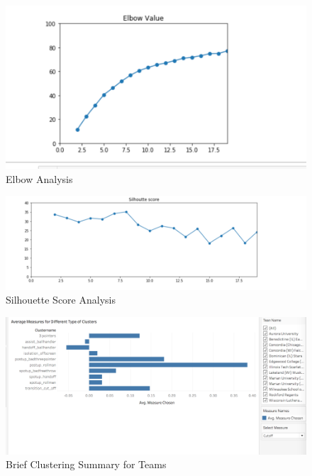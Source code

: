 \documentclass[conference]{IEEEtran}
\begin{document}
\begin{figure}[H]   
  \begin{center}
    \includegraphics[scale=0.5]{Picture2.jpg}
    \caption{Elbow Analysis}\label{Saturation}
  \end{center}
\end{figure}

\begin{figure}[H]   
  \begin{center}
    \includegraphics[scale=0.5]{Picture3.jpg}
    \caption{Silhouette Score Analysis}\label{Saturation}
  \end{center}
\end{figure}



\begin{figure}[H]   
  \begin{center}
    \includegraphics[scale=0.5]{Picture4.jpg}
    \caption{Brief Clustering Summary for Teams}\label{Saturation}
  \end{center}
\end{figure}
\end{document}
